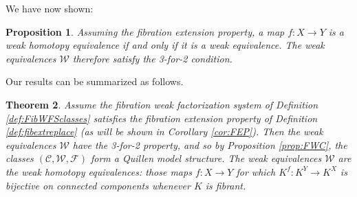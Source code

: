 \documentclass[11pt]{amsart}
\newcommand{\CC}{\ensuremath{\mathcal{C}}}
\newcommand{\WW}{\ensuremath{\mathcal{W}}}
\newcommand{\FF}{\ensuremath{\mathcal{F}}}
\newcommand{\mono}{\ensuremath{\rightarrowtail}}
\newcommand{\ra}{\ensuremath{\rightarrow}}
\renewcommand{\to}{\ensuremath{\rightarrow}}
\newcommand{\onto}{\ensuremath{\twoheadrightarrow}}
\newtheorem{theorem}{Theorem}
\newtheorem{proposition}[theorem]{Proposition}
\newtheorem{lemma}[theorem]{Lemma}
\theoremstyle{remark}
\theoremstyle{definition}
\begin{document}
%

We have now shown:

\begin{proposition}\label{prop:WHEiffWE}
Assuming the fibration extension property, a map $ f : X \to Y$ is a weak homotopy equivalence if and only if it is a weak equivalence.  The weak equivalences $\mathcal{W}$ therefore satisfy the 3-for-2 condition.
\end{proposition}

Our results can be summarized as follows.

\begin{theorem}\label{theorem:QMSmodFEP}
Assume the fibration weak factorization system of Definition \ref{def:FibWFSclasses} satisfies the fibration extension property of Definition \ref{def:fibextreplace} (as will be shown  in Corollary \ref{cor:FEP}). 
Then the weak equivalences $\WW$ have the 3-for-2 property, and so by Proposition \ref{prop:FWC}, the classes $(\CC,\WW,\FF)$ form a Quillen model structure.
The weak equivalences $\WW$  are the \emph{weak homotopy equivalences}: those maps $f: X\ra Y$ for which $K^f : K^Y \to K^X$ is bijective on connected components whenever $K$ is fibrant.
\end{theorem}
\end{document}
